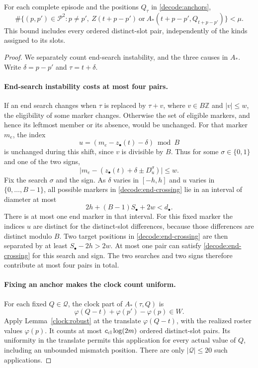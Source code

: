 \begin{proposition}\label{decode:sparsity}
For each complete episode and the positions $Q_\tau$ in
\eqref{decode:anchors},
\begin{equation}
 \#\bigl\{(p,p')\in\mathcal P^2:p\ne p',\
 Z(t+p-p')\ \text{or}\
 A_*(t+p-p',Q_{t+p-p'})\bigr\}<\mu.
 \label{decode:whole-stencil-bound}
\end{equation}
This bound includes every ordered distinct-slot pair, independently
of the kinds assigned to its slots.
\end{proposition}

\begin{proof}
We separately count end-search instability, and the three causes
in $A_*$.  Write $\delta=p-p'$ and $\tau=t+\delta$.

\paragraph{End-search instability costs at most four pairs.}
If an end search changes when $\tau$ is replaced by $\tau+v$,
where $v\in B\mathbb Z$ and $|v|\le w$, the eligibility of some
marker changes.  Otherwise the set of eligible markers, and
hence its leftmost member or its absence, would be unchanged.
For that marker $m_e$, the index
\[
                 u=(m_e-z_\bullet(t)-\delta)\bmod B
\]
is unchanged during this shift, since $v$ is divisible by $B$.
Thus for some $\sigma\in\{0,1\}$ and one of the two signs,
\begin{equation}
 \bigl|m_e-(z_\bullet(t)+\delta\mathbin{\pm}D^\sigma_u)\bigr|
 \le w.
 \label{decode:end-crossing}
\end{equation}
Fix the search $\sigma$ and the sign.  As $\delta$ varies in
$[-h,h]$ and $u$ varies in $\{0,\ldots,B-1\}$, all possible
markers in \eqref{decode:end-crossing} lie in an interval of
diameter at most
\[
                 2h+(B-1)S_\bullet+2w<d_\bullet.
\]
There is at most one end marker in that interval.  For this fixed
marker the indices $u$ are distinct for the distinct-slot
differences, because those differences are distinct modulo $B$.
Two target positions in \eqref{decode:end-crossing} are then
separated by at least $S_\bullet-2h>2w$.
At most one pair can satisfy \eqref{decode:end-crossing} for this
search and sign.  The two searches and two signs therefore
contribute at most four pairs in total.

\paragraph{Fixing an anchor makes the clock count uniform.}
For each fixed $Q\in\mathcal Q$, the clock part of $A_*(\tau,Q)$
is
\[
 \varphi(Q-t)+\varphi(p')-\varphi(p)\in W.
\]
Apply Lemma~\ref{clock:robust} at the translate
$\varphi(Q-t)$, with the realized roster values $\varphi(p)$.
It counts at most $c_{\rm cl}\log(2m)$ ordered distinct-slot
pairs.  Its uniformity in the translate permits this application
for every actual value of $Q$, including an unbounded mismatch
position.  There are only $|\mathcal Q|\le20$ such applications.


\end{proof}
